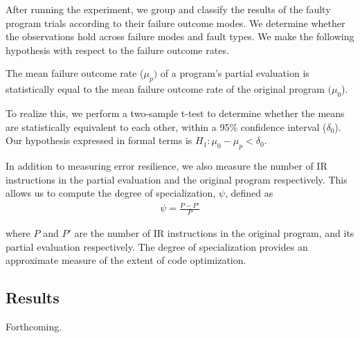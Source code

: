 After running the experiment, we group and classify the results of the faulty program trials according to their failure outcome modes.
We determine whether the observations hold across failure modes and fault types. 
We make the following hypothesis with respect to the failure outcome rates.

\begin{hyp}
  \label{hyp:hypothesis}
  The mean failure outcome rate ($\mu_p)$ of a program's partial evaluation is statistically equal to the mean failure outcome rate of the original program $(\mu_0$).
\end{hyp}

To realize this, we perform a two-sample t-test to determine whether the means are statistically equivalent to each other, within a 95\% confidence interval ($\delta_0$).
Our hypothesis expressed in formal terms is $H_1: \mu_0 - \mu_p < \delta_0 $.

In addition to measuring error resilience, we also measure the number of IR instructions in the partial evaluation and the original program respectively.
This allows us to compute the degree of specialization, $\psi$, defined as
\begin{align*}
\psi = \frac{P - P'}{P}
\end{align*}

where $P$ and $P'$ are the number of IR instructions in the original program, and its partial evaluation respectively.
The degree of specialization provides an approximate measure of the extent of code optimization.


\subsection{Results}
\label{sec:results}
Forthcoming.
